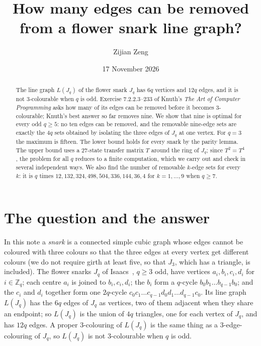 \documentclass[11pt]{amsart}
\theoremstyle{remark}
\begin{document}
\title[Removing edges from flower snark line graphs]{How many edges can be removed from a flower snark line graph?}
\author{Zijian Zeng}
\address{UCSI University, Kuala Lumpur, Malaysia}
\date{17 November 2026}

\begin{abstract}
The line graph $L(J_q)$ of the flower snark $J_q$ has $6q$ vertices and $12q$ edges, and it is not
$3$-colourable when $q$ is odd. Exercise 7.2.2.3--233 of Knuth's \emph{The Art of Computer Programming}
asks how many of its edges can be removed before it becomes $3$-colourable; Knuth's best answer so far
removes nine. We show that nine is optimal for every odd $q\ge5$: no ten edges can be removed, and the
removable nine-edge sets are exactly the $4q$ sets obtained by isolating the three edges of $J_q$ at one vertex.
For $q=3$ the maximum is fifteen. The lower bound holds for every snark by the parity lemma. The upper bound
uses a $27$-state transfer matrix $T$ around the ring of $J_q$; since $T^2=T^4$, the problem for all $q$
reduces to a finite computation, which we carry out and check in several independent ways. We also find the
number of removable $k$-edge sets for every $k$: it is $q$ times $12,132,324,498,504,336,144,36,4$ for
$k=1,\dots,9$ when $q\ge7$.
\end{abstract}
\maketitle

\section{The question and the answer}
In this note a \emph{snark} is a connected simple cubic graph whose edges cannot be coloured with three
colours so that the three edges at every vertex get different colours (we do not require girth at least five,
so that $J_3$, which has a triangle, is included). The flower snarks $J_q$ of Isaacs~\cite{isaacs}, $q\ge3$
odd, have vertices $a_i,b_i,c_i,d_i$ for $i\in\mathbb Z_q$; each centre $a_i$ is joined to $b_i,c_i,d_i$; the
$b_i$ form a $q$-cycle $b_0b_1\ldots b_{q-1}b_0$; and the $c_i$ and $d_i$ together form one $2q$-cycle
$c_0c_1\ldots c_{q-1}d_0d_1\ldots d_{q-1}c_0$. Its line graph $L(J_q)$ has the $6q$ edges of $J_q$ as vertices,
two of them adjacent when they share an endpoint; so $L(J_q)$ is the union of $4q$ triangles, one for each
vertex of $J_q$, and has $12q$ edges. A proper $3$-colouring of $L(J_q)$ is the same thing as a $3$-edge-colouring
of $J_q$, so $L(J_q)$ is not $3$-colourable when $q$ is odd.
\end{document}
